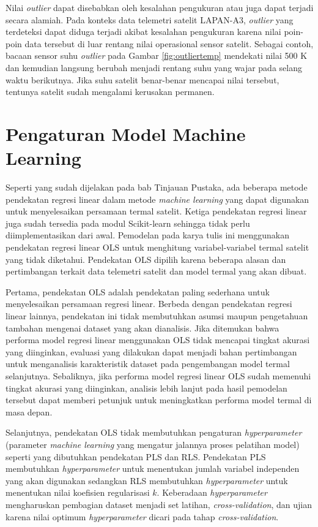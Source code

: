 Nilai \textit{outlier} dapat disebabkan oleh kesalahan pengukuran atau juga
dapat terjadi secara alamiah. Pada konteks data telemetri satelit LAPAN-A3,
\textit{outlier} yang terdeteksi dapat diduga terjadi akibat kesalahan
pengukuran karena nilai poin-poin data tersebut di luar rentang nilai
operasional sensor satelit. Sebagai contoh, bacaan sensor suhu \textit{outlier}
pada Gambar \ref{fig:outliertemp} mendekati nilai 500 K dan kemudian langsung
berubah menjadi rentang suhu yang wajar pada selang waktu berikutnya. Jika suhu
satelit benar-benar mencapai nilai tersebut, tentunya satelit sudah mengalami
kerusakan permanen.

\section{Pengaturan Model Machine Learning}

Seperti yang sudah dijelakan pada bab Tinjauan Pustaka, ada beberapa metode
pendekatan regresi linear dalam metode \textit{machine learning} yang dapat
digunakan untuk menyelesaikan persamaan termal satelit. Ketiga pendekatan
regresi linear juga sudah tersedia pada modul Scikit-learn sehingga tidak perlu
diimplementasikan dari awal. Pemodelan pada karya tulis ini menggunakan
pendekatan regresi linear OLS untuk menghitung variabel-variabel termal satelit
yang tidak diketahui. Pendekatan OLS dipilih karena beberapa alasan dan
pertimbangan terkait data telemetri satelit dan model termal yang akan dibuat. 

Pertama, pendekatan OLS adalah pendekatan paling sederhana untuk menyelesaikan
persamaan regresi linear. Berbeda dengan pendekatan regresi linear lainnya,
pendekatan ini tidak membutuhkan asumsi maupun pengetahuan tambahan mengenai
dataset yang akan dianalisis. Jika ditemukan bahwa performa model regresi
linear menggunakan OLS tidak mencapai tingkat akurasi yang diinginkan, evaluasi
yang dilakukan dapat menjadi bahan pertimbangan untuk menganalisis
karakteristik dataset pada pengembangan model termal selanjutnya. Sebaliknya,
jika performa model regresi linear OLS sudah memenuhi tingkat akurasi yang
diinginkan, analisis lebih lanjut pada hasil pemodelan tersebut dapat memberi
petunjuk untuk meningkatkan performa model termal di masa depan.

Selanjutnya, pendekatan OLS tidak membutuhkan pengaturan \textit{hyperparameter}
(parameter \textit{machine learning} yang mengatur jalannya proses pelatihan
model) seperti yang dibutuhkan pendekatan PLS dan RLS. Pendekatan PLS
membutuhkan \textit{hyperparameter} untuk menentukan jumlah variabel independen
yang akan digunakan sedangkan RLS membutuhkan \textit{hyperparameter} untuk
menentukan nilai koefisien regularisasi $k$. Keberadaan \textit{hyperparameter}
mengharuskan pembagian dataset menjadi set latihan, \textit{cross-validation},
dan ujian karena nilai optimum \textit{hyperparameter} dicari pada tahap
\textit{cross-validation}.

